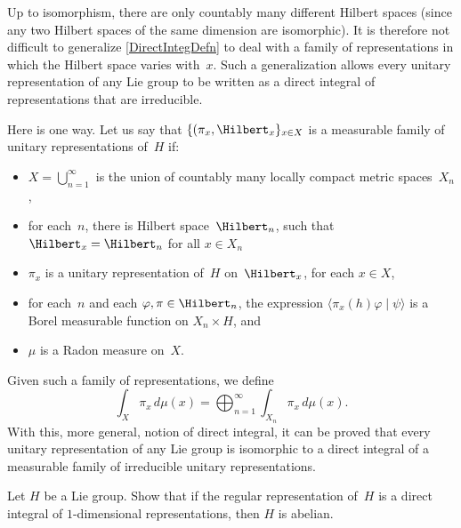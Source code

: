 \begin{rem} \label{GeneralDirectIntegDefn}
Up to isomorphism, there are only countably many different Hilbert spaces (since any two Hilbert spaces of the same dimension are isomorphic). It is therefore not difficult to generalize \cref{DirectIntegDefn} to deal with a family of representations in which the Hilbert space varies with~$x$. Such a generalization allows every unitary representation of any Lie group to be written as a direct integral of representations that are irreducible.

Here is one way.
Let us say that
$\{(\pi_x,\Hilbert_x\}_{x \in X}$ is a measurable family of unitary representations of~$H$ if:
	\begin{itemize}
	\item $X = \bigcup_{n=1}^\infty$ is the union of countably many locally compact metric spaces~$X_n$,
	\item for each~$n$, there is Hilbert space~$\Hilbert_n$, such that $\Hilbert_x = \Hilbert_n$ for all $x \in X_n$
	\item $\pi_x$ is a unitary representation of~$H$ on~$\Hilbert_x$, for each $x \in X$,
	\item for each~$n$ and each $\varphi,\pi \in \Hilbert_n$, the expression $\langle \pi_x(h) \varphi \mid \psi \rangle$ is a Borel measurable function on $X_n \times H$,
	and
	\item $\mu$ is a Radon measure on~$X$.
	\end{itemize}
Given such a family of representations, we define
	$$ \int_X \pi_x \, d\mu(x) = \bigoplus_{n=1}^\infty \int_{X_n} \pi_x \, d\mu(x) .$$
With this, more general, notion of direct integral, it can be proved that every unitary representation of any Lie group is isomorphic to a direct integral of a measurable family of irreducible unitary representations.
\end{rem}


\begin{exercises}

\item \label{1D->Abel}
Let $H$ be a Lie group. Show that if the regular representation of~$H$ is a direct integral of $1$-dimensional representations, then $H$ is abelian.

\end{exercises}


